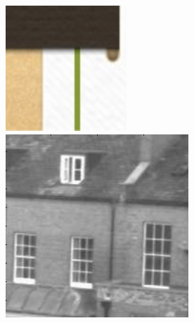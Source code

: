 \documentclass[11pt]{article}
\begin{document}
\begin{figure}[!htb]
\begin{center}
\begin{multicols}{4}
	\includegraphics[height = \linewidth]{test}\
	\includegraphics[height = \linewidth]{house}\

\end{multicols}
\end{center}
\end{figure}
\end{document}
